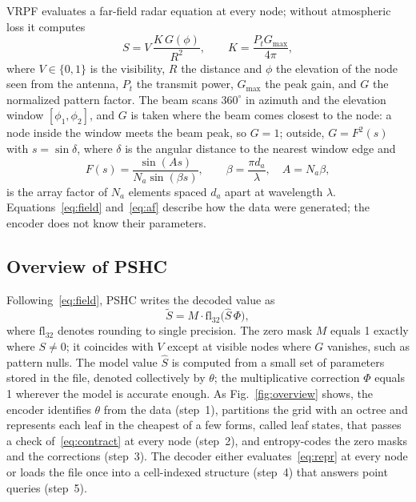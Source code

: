 \documentclass[conference]{IEEEtran}
\newcommand{\fl}{\mathrm{fl}_{32}}
\begin{document}
VRPF evaluates a far-field radar equation at every node; without atmospheric loss it computes
\begin{equation}
S=V\,\frac{K\,G(\phi)}{R^2},\qquad K=\frac{P_tG_{\max}}{4\pi},
\label{eq:field}
\end{equation}
where $V\in\{0,1\}$ is the visibility, $R$ the distance and $\phi$ the elevation of the node seen from the antenna, $P_t$ the transmit power, $G_{\max}$ the peak gain, and $G$ the normalized pattern factor. The beam scans $360^\circ$ in azimuth and the elevation window $[\phi_1,\phi_2]$, and $G$ is taken where the beam comes closest to the node: a node inside the window meets the beam peak, so $G=1$; outside, $G=F^2(s)$ with $s=\sin\delta$, where $\delta$ is the angular distance to the nearest window edge and
\begin{equation}
F(s)=\frac{\sin(As)}{N_a\sin(\beta s)},\qquad \beta=\frac{\pi d_a}{\lambda},\quad A=N_a\beta,
\label{eq:af}
\end{equation}
is the array factor of $N_a$ elements spaced $d_a$ apart at wavelength $\lambda$. Equations~\eqref{eq:field} and~\eqref{eq:af} describe how the data were generated; the encoder does not know their parameters.

\subsection{Overview of PSHC}

Following~\eqref{eq:field}, PSHC writes the decoded value as
\begin{equation}
\tilde S=M\cdot\fl\big(\hat S\,\Phi\big),
\label{eq:repr}
\end{equation}
where $\fl$ denotes rounding to single precision. The zero mask $M$ equals 1 exactly where $S\neq0$; it coincides with $V$ except at visible nodes where $G$ vanishes, such as pattern nulls. The model value $\hat S$ is computed from a small set of parameters stored in the file, denoted collectively by $\theta$; the multiplicative correction $\Phi$ equals 1 wherever the model is accurate enough. As Fig.~\ref{fig:overview} shows, the encoder identifies $\theta$ from the data (step~1), partitions the grid with an octree and represents each leaf in the cheapest of a few forms, called leaf states, that passes a check of~\eqref{eq:contract} at every node (step~2), and entropy-codes the zero masks and the corrections (step~3). The decoder either evaluates~\eqref{eq:repr} at every node or loads the file once into a cell-indexed structure (step~4) that answers point queries (step~5).
\end{document}

